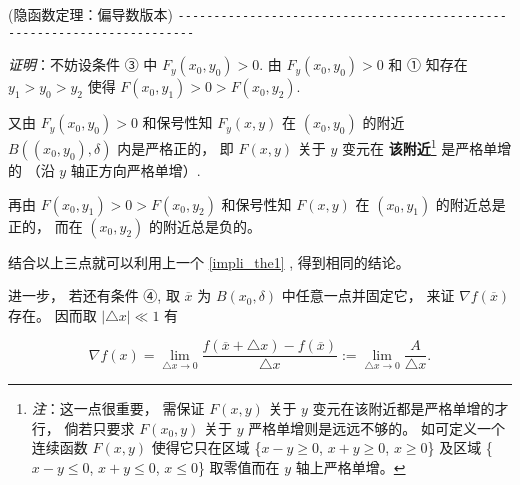 \begin{theorem}{(隐函数定理：偏导数版本)}
\verb|------------------------------------------------------------------------|

\textsl{证明}：不妨设条件 ③ 中 $F_{y}(x_{0},y_{0})>0.$ 由 $F_{y}(x_{0},y_{0})>0$ 和
① 知存在 $y_{1}>y_{0}>y_{2}$ 使得 $F(x_{0},y_{1})>0>F(x_{0},y_{2})$. 

又由 $F_{y}(x_{0},y_{0})>0$ 和保号性知 $F_{y}(x,y)$ 在 $(x_{0},y_{0})$
的附近 $B((x_{0},y_{0}),\delta)$ 内是严格正的， 即 $F(x,y)$ 关于 $y$ 变元在 \textbf{该附近}\footnote{\textsl{注}：这一点很重要， 需保证 $F(x,y)$ 关于 $y$ 变元在该附近都是严格单增的才行， 倘若只要求 $F(x_{0},y)$
关于 $y$ 严格单增则是远远不够的。 如可定义一个连续函数 $F(x,y)$ 使得它只在区域 \{$x-y\geqslant0$,
$x+y\geqslant0$, $x\geqslant0$\} 及区域 \{$x-y\leqslant0$, $x+y\leqslant0$,
$x\leqslant0$\} 取零值而在 $y$ 轴上严格单增。 } 是严格单增的 （沿 $y$ 轴正方向严格单增）. 

再由 $F(x_{0},y_{1})>0>F(x_{0},y_{2})$ 和保号性知 $F(x,y)$ 在 $(x_{0},y_{1})$
的附近总是正的， 而在 $(x_{0},y_{2})$ 的附近总是负的。 

结合以上三点就可以利用上一个 \autoref{impli_the1} , 得到相同的结论。 

进一步， 若还有条件 ④, 取 \textbf{$\overline{x}$ }为 $B(x_{0},\delta)$ 中任意一点并固定它， 来证 $\nabla f(\overline{x})$存在。 因而取 $\left|\triangle x\right|\ll1$
有

\begin{equation}\label{impli_eq1}
\nabla f(x)={\displaystyle {\displaystyle \lim_{\triangle x\rightarrow0}}\frac{f(\overline{x}+\triangle x)-f(\overline{x})}{\triangle x}:={\displaystyle \lim_{\triangle x\rightarrow0}}\frac{A}{\triangle x}}.
\end{equation}


\end{theorem}
